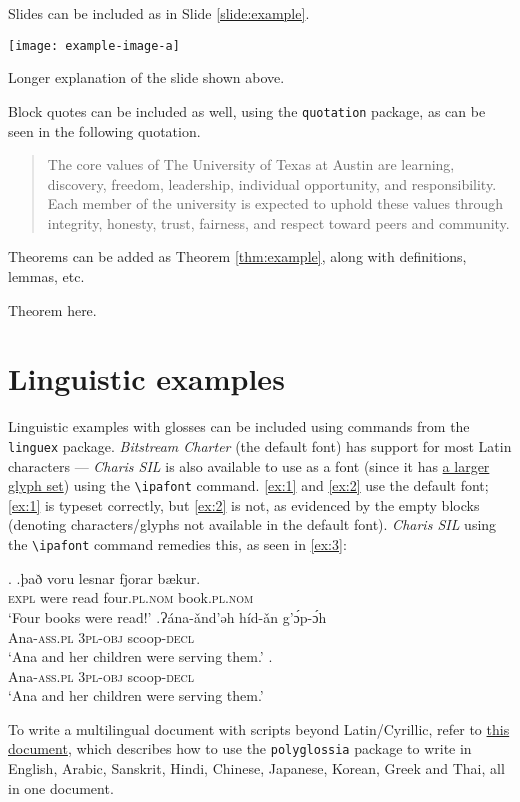 Slides can be included as in Slide \ref{slide:example}.
\begin{slide}[H]
    \centering
    \texttt{[image: example-image-a]}
    \caption[Short example slide title]{Longer explanation of the slide shown above.}
    \label{slide:example}
\end{slide}

Block quotes can be included as well, using the \texttt{quotation} package, as can be seen in the following quotation.
\begin{quotation}
The core values of The University of Texas at Austin are learning, discovery, freedom, leadership, individual opportunity, and responsibility. Each member of the university is expected to uphold these values through integrity, honesty, trust, fairness, and respect toward peers and community.
\end{quotation}

Theorems can be added as Theorem \ref{thm:example}, along with definitions, lemmas, etc.
\begin{thm}
\label{thm:example}
Theorem here.
\end{thm}

\section{Linguistic examples}

Linguistic examples with glosses can be included using commands from the \texttt{linguex} package. \emph{Bitstream Charter} (the default font) has support for most Latin characters --- \emph{Charis SIL} is also available to use as a font (since it has \href{https://software.sil.org/charis/charset/}{a larger glyph set}) using the \texttt{\textbackslash{}ipafont} command. \ref{ex:1} and \ref{ex:2} use the default font; \ref{ex:1} is typeset correctly, but \ref{ex:2} is not, as evidenced by the empty blocks (denoting characters/glyphs not available in the default font). \emph{Charis SIL} using the \texttt{\textbackslash{}ipafont} command remedies this, as seen in \ref{ex:3}:

\ex. \ag.\label{ex:1}það voru lesnar fjorar bækur.\\
          \textsc{expl} were read four.\textsc{pl.nom} book.\textsc{pl.nom}\\
          `Four books were read!'
     \bg.\label{ex:2}Ɂána-ǎnd’ǝh 	híd-ǎn 		g’ɔ́p-ɔ́h\\
         Ana-\textsc{ass.pl} \textsc{3pl-obj} scoop-\textsc{decl}\\
          `Ana and her children were serving them.'
     \bg.\label{ex:3}  \\
          Ana-\textsc{ass.pl} \textsc{3pl-obj} scoop-\textsc{decl}\\
          `Ana and her children were serving them.'

To write a multilingual document with scripts beyond Latin/Cyrillic, refer to \href{https://www.overleaf.com/latex/templates/how-to-write-multilingual-text-with-different-scripts-in-latex-on-overleaf/wfdxqhcyyjxz}{this document}, which describes how to use the \texttt{polyglossia} package to write in English, Arabic, Sanskrit, Hindi, Chinese, Japanese, Korean, Greek and Thai, all in one document.
